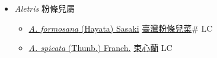 
  \begin{itemize}
 \item[] \textit{Aletris} 粉條兒屬
                    
  \begin{itemize}
        \item[] \href{http://www.theplantlist.org/tpl1.1/search?q=Aletris+formosana}{\textit{A. formosana} (Hayata) Sasaki}   \href{\detokenize{http://taibnet.sinica.edu.tw/chi/taibnet_species_list.php?T2=臺灣粉條兒菜&T2_new_value=true&fr=y}}{臺灣粉條兒菜}\# LC
        \item[] \href{http://www.theplantlist.org/tpl1.1/search?q=Aletris+spicata}{\textit{A. spicata} (Thunb.) Franch.}   \href{\detokenize{http://taibnet.sinica.edu.tw/chi/taibnet_species_list.php?T2=束心蘭&T2_new_value=true&fr=y}}{束心蘭} LC
  \end{itemize}
  \end{itemize}
